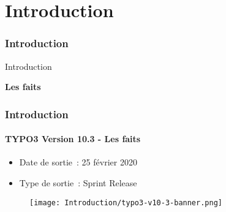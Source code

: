 %

\section{Introduction}
\begin{frame}[fragile]
	\frametitle{Introduction}

	\begin{center}\huge{Introduction}\end{center}
	\begin{center}\huge{\color{typo3darkgrey}\textbf{Les faits}}\end{center}

\end{frame}


\begin{frame}[fragile]
	\frametitle{Introduction}
	\framesubtitle{TYPO3 Version 10.3 - Les faits}

	\begin{itemize}
		\item Date de sortie~: 25 février 2020
		\item Type de sortie~: Sprint Release
	\end{itemize}

	\begin{figure}
		\texttt{[image: Introduction/typo3-v10-3-banner.png]}
	\end{figure}

\end{frame}


